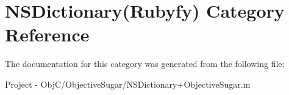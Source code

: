 \hypertarget{category_n_s_dictionary_07_rubyfy_08}{}\section{N\+S\+Dictionary(Rubyfy) Category Reference}
\label{category_n_s_dictionary_07_rubyfy_08}


The documentation for this category was generated from the following file\+:\begin{DoxyCompactItemize}
\item 
Project -\/ Obj\+C/\+Objective\+Sugar/N\+S\+Dictionary+\+Objective\+Sugar.\+m\end{DoxyCompactItemize}
